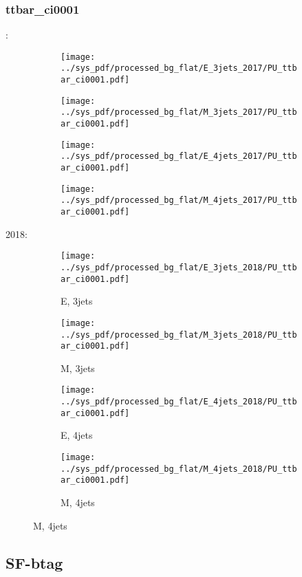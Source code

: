 \documentclass{beamer}
\begin{document}
\begin{frame}
\frametitle{ttbar_ci0001}
\fontsize{5}{1}:
\begin{figure}
\centering
\begin{subfigure}[b]{0.24\textwidth}
\texttt{[image: ../sys\_pdf/processed\_bg\_flat/E\_3jets\_2017/PU\_ttbar\_ci0001.pdf]}
\end{subfigure}
\begin{subfigure}[b]{0.24\textwidth}
\texttt{[image: ../sys\_pdf/processed\_bg\_flat/M\_3jets\_2017/PU\_ttbar\_ci0001.pdf]}
\end{subfigure}
\begin{subfigure}[b]{0.24\textwidth}
\texttt{[image: ../sys\_pdf/processed\_bg\_flat/E\_4jets\_2017/PU\_ttbar\_ci0001.pdf]}
\end{subfigure}
\begin{subfigure}[b]{0.24\textwidth}
\texttt{[image: ../sys\_pdf/processed\_bg\_flat/M\_4jets\_2017/PU\_ttbar\_ci0001.pdf]}
\end{subfigure}
\end{figure}
2018:
\begin{figure}
\centering
\begin{subfigure}[b]{0.24\textwidth}
\texttt{[image: ../sys\_pdf/processed\_bg\_flat/E\_3jets\_2018/PU\_ttbar\_ci0001.pdf]}
\captionsetup{font=tiny}
\caption{E, 3jets}
\end{subfigure}
\begin{subfigure}[b]{0.24\textwidth}
\texttt{[image: ../sys\_pdf/processed\_bg\_flat/M\_3jets\_2018/PU\_ttbar\_ci0001.pdf]}
\captionsetup{font=tiny}
\caption{M, 3jets}
\end{subfigure}
\begin{subfigure}[b]{0.24\textwidth}
\texttt{[image: ../sys\_pdf/processed\_bg\_flat/E\_4jets\_2018/PU\_ttbar\_ci0001.pdf]}
\captionsetup{font=tiny}
\caption{E, 4jets}
\end{subfigure}
\begin{subfigure}[b]{0.24\textwidth}
\texttt{[image: ../sys\_pdf/processed\_bg\_flat/M\_4jets\_2018/PU\_ttbar\_ci0001.pdf]}
\captionsetup{font=tiny}
\caption{M, 4jets}
\end{subfigure}
\end{figure}
\end{frame}


\subsection{SF-btag}
\end{document}
